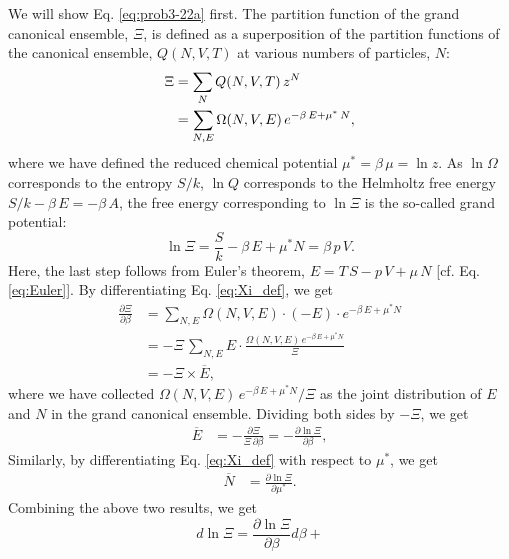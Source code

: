 \documentclass[twocolumn, 10pt]{article}
\numberwithin{equation}{section}
\newenvironment{solution}[1][\empty]
{\par\medskip\sffamily
  \textbf{\ifx\empty#1{Solution.}\relax\else{#1}\fi} \ignorespaces}
{\medskip}
\begin{document}
\begin{solution}
We will show Eq. \eqref{eq:prob3-22a} first.
The partition function of the grand canonical ensemble, $\Xi$,
is defined as a superposition of
the partition functions of the canonical ensemble, $Q(N, V, T)$
at various numbers of particles, $N$:
%
\begin{align}
\Xi
  &=
  \sum_{N} Q(N, V, T) \, z^N
  \notag \\
  &=
  \sum_{N, E} \Omega(N, V, E) \, e^{-\beta \, E + \mu^* \, N}
,
  \label{eq:Xi_def}
\end{align}
%
where we have defined the reduced chemical potential $\mu^* = \beta \, \mu = \ln z$.
%
As $\ln \Omega$ corresponds to the entropy $S/k$,
$\ln Q$ corresponds to the Helmholtz free energy $S/k - \beta \, E = -\beta \, A$,
the free energy corresponding to $\ln \Xi$
is the so-called grand potential:
%
\begin{equation}
  \ln \Xi
  = \frac{S}{k} - \beta \, E + \mu^* N
  = \beta \, p \, V
  .
  \label{eq:lnXi}
\end{equation}
Here, the last step follows from Euler's theorem,
$E = T \, S - p \, V + \mu \, N$ [cf. Eq. \eqref{eq:Euler}].
%
By differentiating Eq. \eqref{eq:Xi_def}, we get
%
\begin{align*}
  \frac{ \partial \Xi } { \partial \beta }
  &=
  \sum_{N, E} \Omega(N, V, E) \cdot (-E) \cdot e^{-\beta \, E + \mu^* N}
  \\
  &=
  -\Xi \,
  \sum_{N, E} E \cdot \frac{ \Omega(N, V, E) \, e^{-\beta \, E + \mu^* N} } { \Xi }
  \\
  &=
  -\Xi \times \overline{E}
  ,
\end{align*}
%
where we have collected
$\Omega(N, V, E) \, e^{-\beta \, E + \mu^* N}/\Xi$
as the joint distribution of $E$ and $N$
in the grand canonical ensemble.
%
Dividing both sides by $-\Xi$,
we get
\begin{align}
  \overline E
  &=
  -\frac{ \partial \Xi } { \Xi \, \partial \beta }
  =
  -\frac{ \partial \ln \Xi } { \partial \beta }
  ,
  \label{eq:dXidbeta}
\end{align}
Similarly, by differentiating Eq. \eqref{eq:Xi_def}
with respect to $\mu^*$, we get
\begin{align}
  \overline N &= \frac{ \partial \ln \Xi } { \partial \mu^* }
  .
  \label{eq:dXidmu}
\end{align}
%
Combining the above two results, we get
\begin{equation}
  d \ln \Xi
  =
  \frac{ \partial \ln \Xi } { \partial \beta } d\beta
  +

\end{equation}
\end{solution}
\end{document}
